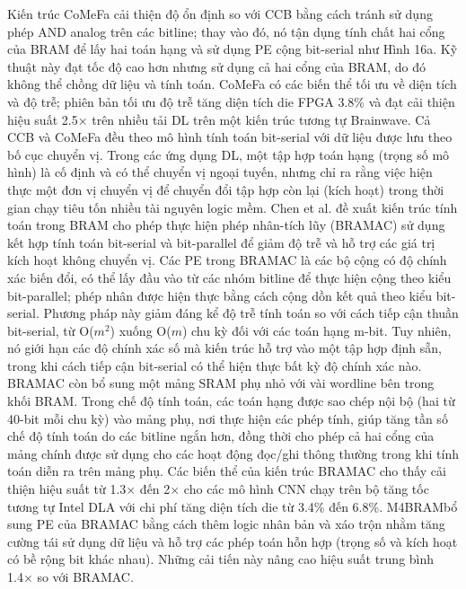 \documentclass[a4paper]{article}
\begin{document}
Kiến trúc CoMeFa cải thiện độ ổn định so với CCB bằng cách tránh sử dụng phép AND analog trên các bitline; thay vào đó, nó tận dụng tính chất hai cổng của BRAM để lấy hai toán hạng và sử dụng PE cộng bit-serial như Hình 16a. Kỹ thuật này đạt tốc độ cao hơn nhưng sử dụng cả hai cổng của BRAM, do đó không thể chồng dữ liệu và tính toán. CoMeFa có các biến thể tối ưu về diện tích và độ trễ; phiên bản tối ưu độ trễ tăng diện tích die FPGA 3.8\% và đạt cải thiện hiệu suất 2.5× trên nhiều tải DL trên một kiến trúc tương tự Brainwave. Cả CCB và CoMeFa đều theo mô hình tính toán bit-serial với dữ liệu được lưu theo bố cục chuyển vị. Trong các ứng dụng DL, một tập hợp toán hạng (trọng số mô hình) là cố định và có thể chuyển vị ngoại tuyến, nhưng chỉ ra rằng việc hiện thực một đơn vị chuyển vị để chuyển đổi tập hợp còn lại (kích hoạt) trong thời gian chạy tiêu tốn nhiều tài nguyên logic mềm. Chen et al. đề xuất kiến trúc tính toán trong BRAM cho phép thực hiện phép nhân-tích lũy (BRAMAC) sử dụng kết hợp tính toán bit-serial và bit-parallel để giảm độ trễ và hỗ trợ các giá trị kích hoạt không chuyển vị. Các PE trong BRAMAC là các bộ cộng có độ chính xác biến đổi, có thể lấy đầu vào từ các nhóm bitline để thực hiện cộng theo kiểu bit-parallel; phép nhân được hiện thực bằng cách cộng dồn kết quả theo kiểu bit-serial. Phương pháp này giảm đáng kể độ trễ tính toán so với cách tiếp cận thuần bit-serial, từ O($m^2$) xuống O($m$) chu kỳ đối với các toán hạng m-bit. Tuy nhiên, nó giới hạn các độ chính xác số mà kiến trúc hỗ trợ vào một tập hợp định sẵn, trong khi cách tiếp cận bit-serial có thể hiện thực bất kỳ độ chính xác nào. BRAMAC còn bổ sung một mảng SRAM phụ nhỏ với vài wordline bên trong khối BRAM. Trong chế độ tính toán, các toán hạng được sao chép nội bộ (hai từ 40-bit mỗi chu kỳ) vào mảng phụ, nơi thực hiện các phép tính, giúp tăng tần số chế độ tính toán do các bitline ngắn hơn, đồng thời cho phép cả hai cổng của mảng chính được sử dụng cho các hoạt động đọc/ghi thông thường trong khi tính toán diễn ra trên mảng phụ. Các biến thể của kiến trúc BRAMAC cho thấy cải thiện hiệu suất từ 1.3× đến 2× cho các mô hình CNN chạy trên bộ tăng tốc tương tự Intel DLA với chi phí tăng diện tích die từ 3.4\% đến 6.8\%. M4BRAMbổ sung PE của BRAMAC bằng cách thêm logic nhân bản và xáo trộn nhằm tăng cường tái sử dụng dữ liệu và hỗ trợ các phép toán hỗn hợp (trọng số và kích hoạt có bề rộng bit khác nhau). Những cải tiến này nâng cao hiệu suất trung bình 1.4× so với BRAMAC.
\end{document}
